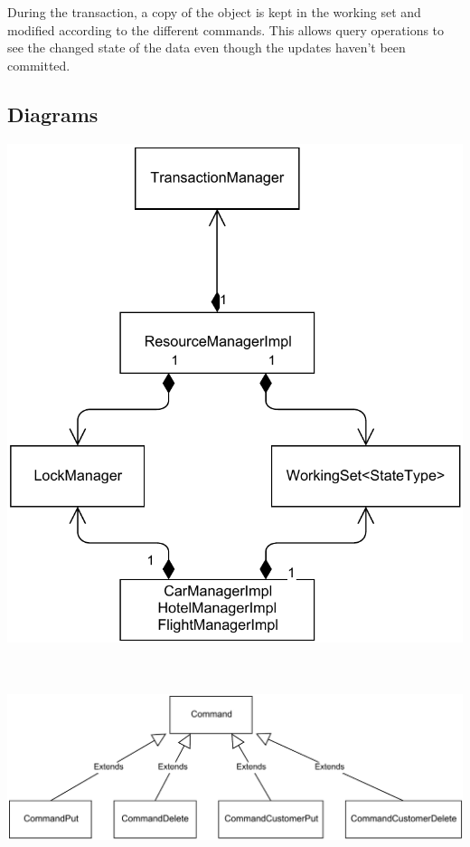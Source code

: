 \documentclass[10pt]{article}
\begin{document}
During the transaction, a copy of the object is kept in the working
set and modified according to the different commands.  This allows
query operations to see the changed state of the data even though the
updates haven't been committed.

\subsection{Diagrams}

\begin{center}
\includegraphics[scale=0.6]{class_diagram.pdf}

~\\~ \\

\includegraphics[scale=0.5]{command_hierarchy.pdf}
\end{center}
\end{document}
